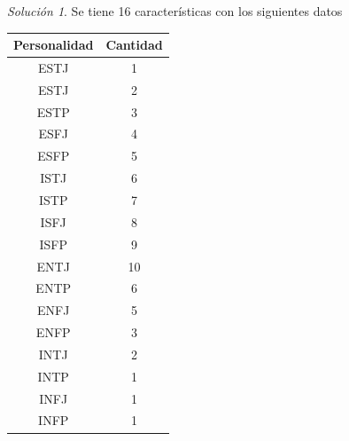 \documentclass[
  10pt,
]{krantz}
\theoremstyle{definition}
\theoremstyle{definition}
\theoremstyle{definition}
\theoremstyle{definition}
\theoremstyle{remark}
\newtheorem*{solution}{Solución}
\begin{document}
\begin{solution}
{}
Se tiene 16 características con los siguientes datos

\begin{longtable}[]{@{}cc@{}}
\toprule
Personalidad & Cantidad \\
\midrule
\endhead
ESTJ & 1 \\
ESTJ & 2 \\
ESTP & 3 \\
ESFJ & 4 \\
ESFP & 5 \\
ISTJ & 6 \\
ISTP & 7 \\
ISFJ & 8 \\
ISFP & 9 \\
ENTJ & 10 \\
ENTP & 6 \\
ENFJ & 5 \\
ENFP & 3 \\
INTJ & 2 \\
INTP & 1 \\
INFJ & 1 \\
INFP & 1 \\
\bottomrule
\end{longtable}
\end{solution}
\end{document}
